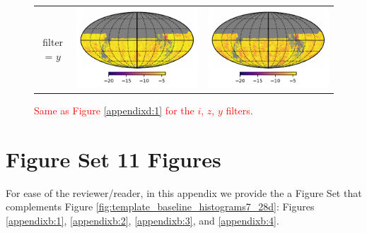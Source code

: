 \documentclass[preprintm,linenumbers]{aastex631}
\providecommand{\red}[1]{\textcolor{red}{#1}}
\begin{document}
\begin{figure}
\begin{tabular}{@{}c@{}c@{}c@{}}
				filter = $y$ & \includegraphics[align=t]{results/skymaps/skymaps_delta_first_year_one_snap_v4_0_10yrs_db_noDD_noTwi_CountMetric_doAllTemplateMetrics_reduceCount_y_7_noDD_noTwi} &				
				\includegraphics[align=t]{results/skymaps/skymaps_delta_first_year_one_snap_v4_0_10yrs_db_noDD_noTwi_CountMetric_doAllTemplateMetrics_reduceCount_y_28_noDD_noTwi} \\
				
			\end{tabular}
			\caption{\red{Same as Figure \ref{appendixd:1} for the $i$, $z$, $y$ filters.
			}}
			\label{appendixd:2}
		\end{figure}
        
        \section{Figure Set 11 Figures}
		
		For ease of the reviewer/reader, in this appendix we provide the a Figure Set that complements Figure \ref{fig:template_baseline_histograms7_28d}: Figures \ref{appendixb:1}, \ref{appendixb:2}, \ref{appendixb:3}, and \ref{appendixb:4}. 
\end{document}
